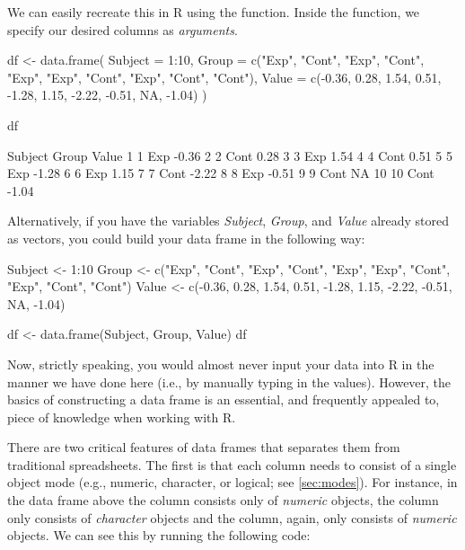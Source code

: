 \medskip



\noindent
We can easily recreate this in R using the  function. Inside the function, we specify our desired columns as \textit{arguments}.

\begin{inR}
df <- data.frame(
  Subject = 1:10,
  Group = c("Exp", "Cont", "Exp", "Cont", "Exp", "Exp",
            "Cont", "Exp", "Cont", "Cont"),
  Value = c(-0.36,  0.28,  1.54,  0.51, -1.28,  1.15,
            -2.22, -0.51,  NA, -1.04)
)

df
\end{inR}
\begin{outR}
   Subject Group Value
1        1   Exp -0.36
2        2  Cont  0.28
3        3   Exp  1.54
4        4  Cont  0.51
5        5   Exp -1.28
6        6   Exp  1.15
7        7  Cont -2.22
8        8   Exp -0.51
9        9  Cont    NA
10      10  Cont -1.04
\end{outR}

\noindent
Alternatively, if you have the variables \textit{Subject}, \textit{Group}, and \textit{Value} already stored as vectors, you could build your data frame in the following way:

\begin{inR}
Subject <- 1:10
Group <- c("Exp", "Cont", "Exp", "Cont", "Exp", "Exp", 
           "Cont", "Exp", "Cont", "Cont")
Value <- c(-0.36,  0.28,  1.54,  0.51, -1.28,  1.15,
           -2.22, -0.51,  NA, -1.04)

df <- data.frame(Subject, Group, Value)
df
\end{inR}

Now, strictly speaking, you would almost never input your data into R in the manner we have done here (i.e., by manually typing in the values). However, the basics of constructing a data frame is an essential, and frequently appealed to, piece of knowledge when working with R.

There are two critical features of data frames that separates them from traditional spreadsheets.  The first is that each column needs to consist of a single object mode (e.g., numeric, character, or logical; see \ref{sec:modes}). For instance, in the data frame above the  column consists only of \textit{numeric} objects, the  column only consists of \textit{character} objects and the  column, again, only consists of \textit{numeric} objects. We can see this by running the following code:

